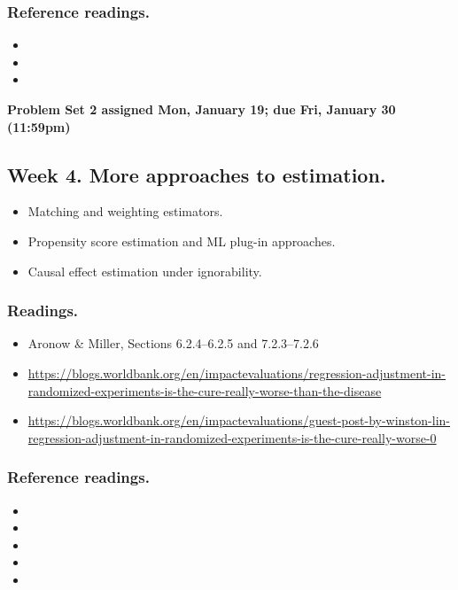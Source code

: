 \documentclass[letterpaper, 12pt, parskip=full,DIV=10]{scrartcl}
\begin{document}
\subsubsection*{Reference readings.}
\begin{itemize}
\item {}
\item {}
\item {}
\end{itemize}

\textbf{Problem Set 2 assigned Mon, January 19; due Fri, January 30 (11:59pm)}

\subsection*{Week 4. More approaches to estimation.}
\begin{itemize}
\item Matching and weighting estimators.
\item Propensity score estimation and ML plug-in approaches.
\item Causal effect estimation under ignorability.
\end{itemize}

\subsubsection*{Readings.}
\begin{itemize}
\item Aronow \& Miller, Sections 6.2.4--6.2.5 and 7.2.3--7.2.6
\item \url{https://blogs.worldbank.org/en/impactevaluations/regression-adjustment-in-randomized-experiments-is-the-cure-really-worse-than-the-disease}
\item \url{https://blogs.worldbank.org/en/impactevaluations/guest-post-by-winston-lin-regression-adjustment-in-randomized-experiments-is-the-cure-really-worse-0}
\end{itemize}

\subsubsection*{Reference readings.}
\begin{itemize}
\item {}
\item {}
\item {}
\item {}
\item {}
\end{itemize}
\end{document}
